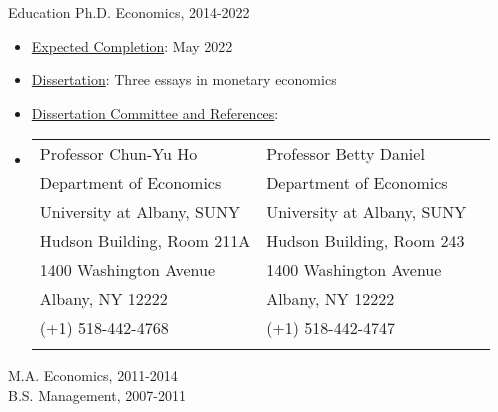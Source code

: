 \documentclass{resume_liang} %
\begin{document}
\begin{rSection}{Education}
Ph.D. Economics, {\bf \href{https://www.albany.edu/economics}{\color{blue}{University at Albany, SUNY}}}  \hfill   {2014-2022}    \vspace{0.1cm}              
  \begin{itemize}
  	\item[] \underline{Expected Completion}: May 2022
  	\item[] \underline{Dissertation}: Three essays in monetary economics
  	\item[] \underline{Dissertation Committee and References}:
  	\item[] \begin{tabular}{lll}
  		Professor Chun-Yu Ho  & Professor Betty Daniel  &  \\ 
  		Department of Economics &  Department of Economics &   \\
  		University at Albany, SUNY & University at Albany, SUNY &   \\
  		Hudson Building, Room 211A & Hudson Building, Room 243 &  \\
  		1400 Washington Avenue & 1400 Washington Avenue &  \\
  		Albany, NY 12222 & Albany, NY 12222  &  \\
  		(+1) 518-442-4768 &  (+1) 518-442-4747 &   \\
  		\href{mailto:cho@albany.edu}{\color{blue}{cho@albany.edu}} & \href{mailto:bdaniel@albany.edu}{\color{blue}{bdaniel@albany.edu}} & \\
  	\end{tabular}
  \end{itemize}
M.A. Economics, {\bf \href{http://en.cufe.edu.cn/}{\color{blue}{Central University of Finance and Economics}}}   \hfill {2011-2014} \vspace{0.1cm}\\
B.S. Management, {\bf \href{https://english.qdu.edu.cn/}{\color{blue}{Qingdao University}}}                            \hfill {2007-2011} \vspace{0.1cm}\\
\end{rSection}
\bigskip \bigskip






\end{document}
